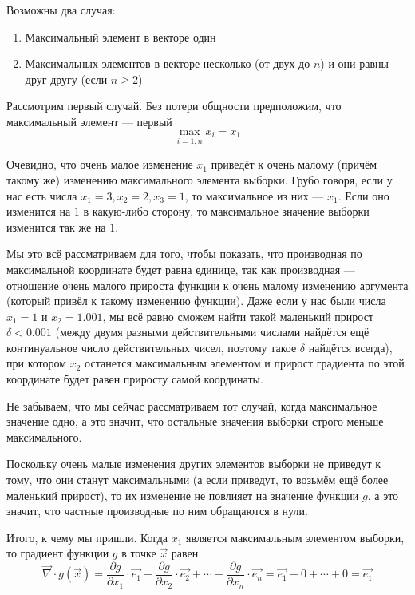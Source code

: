 Возможны два случая:
\begin{enumerate}
    \item Максимальный элемент в векторе один
    \item Максимальных элементов в векторе несколько
        (от двух до $n$) и они равны друг другу (если $n \ge 2$)
\end{enumerate}

Рассмотрим первый случай. Без потери общности предположим,
что максимальный элемент --- первый
$$\max_{i=\overline{1,n}} x_i = x_1$$

Очевидно, что очень малое изменение $x_1$ приведёт к
очень малому (причём такому же) изменению максимального элемента выборки.
Грубо говоря, если у нас есть числа $x_1 = 3, x_2 = 2, x_3 = 1$,
то максимальное из них --- $x_1$. Если оно изменится на $1$
в какую-либо сторону, то максимальное значение выборки изменится
так же на $1$.

Мы это всё рассматриваем для того, чтобы показать,
что производная по максимальной координате будет равна единице,
так как производная --- отношение очень малого прироста функции
к очень малому изменению аргумента (который привёл к такому изменению функции).
Даже если у нас были числа $x_1 = 1$ и $x_2 = 1.001$,
мы всё равно сможем найти такой маленький прирост $\delta < 0.001$
(между двумя разными действительными числами найдётся ещё континуальное число
действительных чисел, поэтому такое $\delta$ найдётся всегда),
при котором $x_2$ останется максимальным элементом и прирост градиента
по этой координате будет равен приросту самой координаты.

Не забываем, что мы сейчас рассматриваем тот случай,
когда максимальное значение одно, а это значит,
что остальные значения выборки строго меньше максимального.

Поскольку очень малые изменения других элементов выборки не приведут к тому,
что они станут максимальными (а если приведут, то возьмём ещё более
маленький прирост), то их изменение не повлияет на значение функции $g$,
а это значит, что частные производные по ним обращаются в нули.

Итого, к чему мы пришли.
Когда $x_1$ является максимальным элементом выборки,
то градиент функции $g$ в точке $\vec{x}$ равен
$$\vec{\nabla} \cdot g\left( \vec{x} \right)
    = \frac{\partial g}{\partial x_1} \cdot \vec{e_1}
        + \frac{\partial g}{\partial x_2} \cdot \vec{e_2}
        + \cdots
        + \frac{\partial g}{\partial x_n} \cdot \vec{e_n}
    = \vec{e_1} + 0 + \cdots + 0 = \vec{e_1}$$

